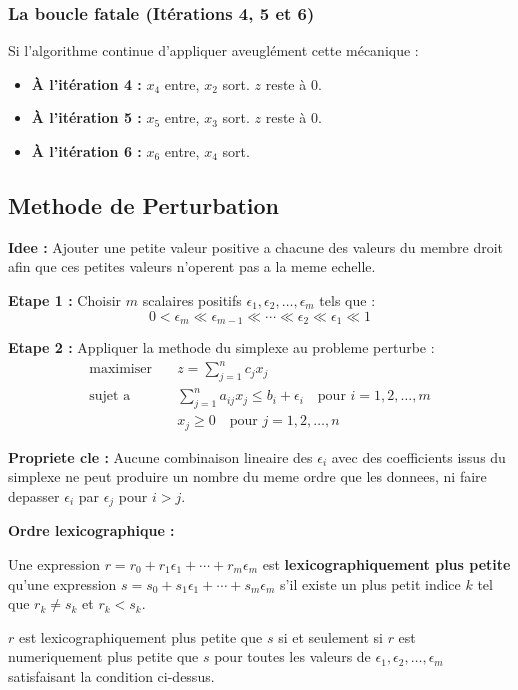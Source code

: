 \documentclass[12pt,a4paper]{article}
\begin{document}
\hrulefill

\subsubsection*{La boucle fatale (Itérations 4, 5 et 6)}

Si l'algorithme continue d'appliquer aveuglément cette mécanique :
\begin{itemize}
    \item \textbf{À l'itération 4 :} $x_4$ entre, $x_2$ sort. $z$ reste à $0$.
    \item \textbf{À l'itération 5 :} $x_5$ entre, $x_3$ sort. $z$ reste à $0$.
    \item \textbf{À l'itération 6 :} $x_6$ entre, $x_4$ sort. 
\end{itemize}

\newpage
\subsection{Methode de Perturbation}

\begin{methode}
\textbf{Idee :} Ajouter une petite valeur positive a chacune des valeurs du membre droit afin que ces petites valeurs n'operent pas a la meme echelle.

\textbf{Etape 1 :} Choisir $m$ scalaires positifs $\epsilon_1, \epsilon_2, \ldots, \epsilon_m$ tels que :
$$0 < \epsilon_m \ll \epsilon_{m-1} \ll \cdots \ll \epsilon_2 \ll \epsilon_1 \ll 1$$

\textbf{Etape 2 :} Appliquer la methode du simplexe au probleme perturbe :
\begin{align*}
\text{maximiser} \quad & z = \sum_{j=1}^{n} c_jx_j\\
\text{sujet a} \quad & \sum_{j=1}^{n} a_{ij}x_j \leq b_i + \epsilon_i \quad \text{pour } i = 1, 2, \ldots, m\\
& x_j \geq 0 \quad \text{pour } j = 1, 2, \ldots, n
\end{align*}

\textbf{Propriete cle :} Aucune combinaison lineaire des $\epsilon_i$ avec des coefficients issus du simplexe ne peut produire un nombre du meme ordre que les donnees, ni faire depasser $\epsilon_i$ par $\epsilon_j$ pour $i > j$.
\end{methode}

\begin{definition}
\textbf{Ordre lexicographique :}

Une expression $r = r_0 + r_1\epsilon_1 + \cdots + r_m\epsilon_m$ est \textcolor{defvert}{\textbf{lexicographiquement plus petite}} qu'une expression $s = s_0 + s_1\epsilon_1 + \cdots + s_m\epsilon_m$ s'il existe un plus petit indice $k$ tel que $r_k \neq s_k$ et $r_k < s_k$.

$r$ est lexicographiquement plus petite que $s$ si et seulement si $r$ est numeriquement plus petite que $s$ pour toutes les valeurs de $\epsilon_1, \epsilon_2, \ldots, \epsilon_m$ satisfaisant la condition ci-dessus.
\end{definition}
\end{document}
